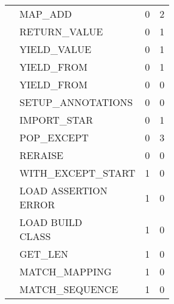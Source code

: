 \begin{longtable}{|p{4cm}|p{4cm}|p{2cm}|p{2cm}|  }
    \cline{2-4} & 

    MAP\_ADD&0&2\\
    
    \cline{2-4} & 

    RETURN\_VALUE&0&1\\
    
    \cline{2-4} & 

    YIELD\_VALUE&0&1\\
    
    \cline{2-4} & 

    YIELD\_FROM&0&1\\
    
    \cline{2-4} &

    YIELD\_FROM&0&0\\
    
    \cline{2-4} &

    SETUP\_ANNOTATIONS&0&0\\
    
    \cline{2-4} &

    IMPORT\_STAR&0&1\\
    
    \cline{2-4} &

    POP\_EXCEPT&0&3\\
  
    \cline{2-4} &

    RERAISE&0&0\\
    
    \cline{2-4} &

    WITH\_EXCEPT\_START&1&0\\
    
    \cline{2-4} &

    \makecell{LOAD ASSERTION \\ ERROR}&1&0\\
    
    \cline{2-4} &

    \makecell{LOAD BUILD \\ CLASS}&1&0\\
    
    \cline{2-4} &

    GET\_LEN&1&0\\
    
    \cline{2-4} &

    MATCH\_MAPPING&1&0\\
    
    \cline{2-4} &

    MATCH\_SEQUENCE&1&0\\
    

\end{longtable}
